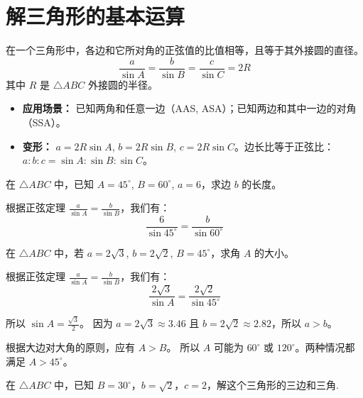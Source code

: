 \section{解三角形的基本运算}

\begin{theorem}[正弦定理]
    在一个三角形中，各边和它所对角的正弦值的比值相等，且等于其外接圆的直径。
    $$
        \frac{a}{\sin A} = \frac{b}{\sin B} = \frac{c}{\sin C} = 2R
    $$
    其中 $R$ 是 $\triangle ABC$ 外接圆的半径。
    \begin{itemize}
        \item \textbf{应用场景：} 已知两角和任意一边（AAS, ASA）；已知两边和其中一边的对角（SSA）。
        \item \textbf{变形：} $a = 2R \sin A$, $b = 2R \sin B$, $c = 2R \sin C$。边长比等于正弦比：$a:b:c = \sin A : \sin B : \sin C$。
    \end{itemize}
\end{theorem}

\begin{example}
    在 $\triangle ABC$ 中，已知 $A=45^\circ$, $B=60^\circ$, $a=6$，求边 $b$ 的长度。
\end{example}
\begin{solution}
    根据正弦定理 $\frac{a}{\sin A} = \frac{b}{\sin B}$，我们有：
    $$
        \frac{6}{\sin 45^\circ} = \frac{b}{\sin 60^\circ}
    $$
\end{solution}
\vspace{2em}


\begin{example}
    在 $\triangle ABC$ 中，若 $a=2\sqrt{3}$, $b=2\sqrt{2}$, $B=45^\circ$，求角 $A$ 的大小。
\end{example}
\begin{solution}
    根据正弦定理 $\frac{a}{\sin A} = \frac{b}{\sin B}$，我们有：
    $$
        \frac{2\sqrt{3}}{\sin A} = \frac{2\sqrt{2}}{\sin 45^\circ}
    $$

    所以 $\sin A = \frac{\sqrt{3}}{2}$。
    因为 $a=2\sqrt{3} \approx 3.46$ 且 $b=2\sqrt{2} \approx 2.82$，所以 $a > b$。

    根据大边对大角的原则，应有 $A > B$。
    所以 $A$ 可能为 $60^\circ$ 或 $120^\circ$。两种情况都满足 $A > 45^\circ$。
\end{solution}
\vspace{2em}

\begin{example}
    在 $\triangle ABC$ 中，已知 $B=30^\circ$，$b=\sqrt{2}$，$c=2$，解这个三角形的三边和三角.
\end{example}

